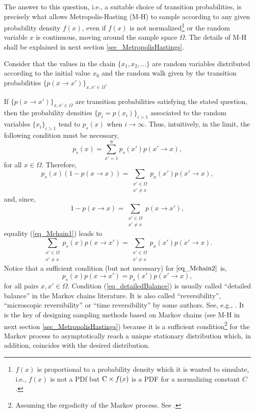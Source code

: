 The answer to this question, i.e., a suitable choice of transition probabilities, is precisely what allows Metropolis-Hasting (M-H) to sample according to any given probability density $f(x)$, even if $f(x)$ is not normalized\footnote{$f(x)$ is proportional to a probability density which it is wanted to simulate, i.e., $f(x)$ is not a PDf but $\textup{C}\times f(x)$ is a PDF for a normalizing constant $C$.} or the random variable $x$ is continuous, moving around the sample space $\Omega$. The details of M-H shall be explained in next section \ref{sec_MetropolisHastings}.

Consider that the values in the chain $\{x_1, x_2, \dots\}$ are random variables distributed according to the initial value $x_0$ and the random walk given by the transition probabilities $\{p(x \rightarrow x')\}_{x,x' \in \Omega}$.
 
If $\{p(x \rightarrow x')\}_{x,x' \in \Omega}$ are transition probabilities satisfying the stated question, then the probability densities $\{p_i = p(x_i)\}_{i>1}$ associated to the random variables $\{x_i\}_{i>1}$ tend to $p_s(x)$ when $i \to \infty$. Thus, intuitively, in the limit, the following condition must be necessary,
$$
  p_s(x) = \sum_{x'=1}^9 p_s(x')p(x' \rightarrow x),
$$  
for all $x \in \Omega$. Therefore,
\begin{equation} \label{eq_Mchain1}
  p_s(x)\left( 1 - p(x \rightarrow x) \right) = \sum_{\substack{x' \in \Omega \\ x' \neq x}} p_x(x')p(x' \rightarrow x), 
\end{equation}
and, since,
$$
  1 - p(x \rightarrow x) = \sum_{\substack{x' \in \Omega \\ x' \neq x}} p(x \rightarrow x'),
$$
equality (\ref{eq_Mchain1}) leads to
\begin{equation} \label{eq_Mchain2}
  \sum_{\substack{x' \in \Omega \\ x' \neq x}} p_s(x)p(x \rightarrow x') = \sum_{\substack{x' \in \Omega \\ x' \neq x}} p_x(x')p(x' \rightarrow x).
\end{equation}
Notice that a sufficient condition (but not necessary) for $\ref{eq_Mchain2}$ is,
\begin{equation} \label{eq_detailedBalance}
  p_s(x)p(x \rightarrow x') = p_s(x')p(x' \rightarrow x),
\end{equation}
for all pairs $x, x' \in \Omega$.
Condition (\ref{eq_detailedBalance}) is usually called ``detailed balance'' in the Markov chains literature. It is also called ``reversibility'', ``microscopic reversibility'' or ``time reversibility'' by some authors. 
See, e.g., \textcite{chib1995}.
It is the key of designing sampling methods based on Markov chains (see M-H in next section \ref{sec_MetropolisHastings}) because it is a sufficient condition\footnote{Assuming the ergodicity of the Markov process. See \textcite{robert2004}.} for the Markov process to asymptotically reach a unique stationary distribution which, in addition, coincides with the desired distribution. 

